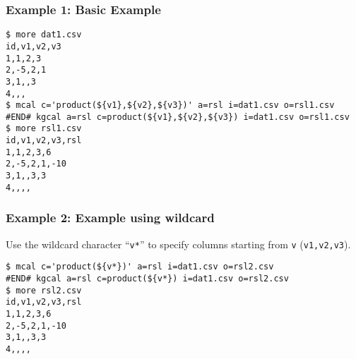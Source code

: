 \subsubsection*{Example 1: Basic Example}



\begin{Verbatim}[baselinestretch=0.7,frame=single]
$ more dat1.csv
id,v1,v2,v3
1,1,2,3
2,-5,2,1
3,1,,3
4,,,
$ mcal c='product(${v1},${v2},${v3})' a=rsl i=dat1.csv o=rsl1.csv
#END# kgcal a=rsl c=product(${v1},${v2},${v3}) i=dat1.csv o=rsl1.csv
$ more rsl1.csv
id,v1,v2,v3,rsl
1,1,2,3,6
2,-5,2,1,-10
3,1,,3,3
4,,,,
\end{Verbatim}
\subsubsection*{Example 2: Example using wildcard }

Use the wildcard character “\verb|v*|” to specify columns starting from \verb|v| (\verb|v1,v2,v3|).


\begin{Verbatim}[baselinestretch=0.7,frame=single]
$ mcal c='product(${v*})' a=rsl i=dat1.csv o=rsl2.csv
#END# kgcal a=rsl c=product(${v*}) i=dat1.csv o=rsl2.csv
$ more rsl2.csv
id,v1,v2,v3,rsl
1,1,2,3,6
2,-5,2,1,-10
3,1,,3,3
4,,,,
\end{Verbatim}
